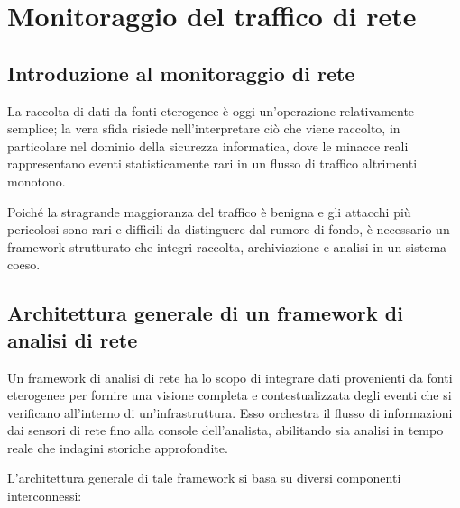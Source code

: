 \section{Monitoraggio del traffico di rete}

\subsection{Introduzione al monitoraggio di rete}

La raccolta di dati da fonti eterogenee è oggi un'operazione relativamente semplice;
la vera sfida risiede nell'interpretare ciò che viene raccolto, in particolare
nel dominio della sicurezza informatica, dove le minacce reali rappresentano
eventi statisticamente rari in un flusso di traffico altrimenti monotono.

Poiché la stragrande maggioranza del traffico è benigna e gli attacchi più pericolosi
sono rari e difficili da distinguere dal rumore di fondo, è necessario un framework
strutturato che integri raccolta, archiviazione e analisi in un sistema coeso.

\subsection{Architettura generale di un framework di analisi di rete}

Un framework di analisi di rete ha lo scopo di integrare dati provenienti da fonti eterogenee
per fornire una visione completa e contestualizzata degli eventi che si verificano
all'interno di un'infrastruttura.
Esso orchestra il flusso di informazioni dai sensori di rete fino alla console dell'analista,
abilitando sia analisi in tempo reale che indagini storiche approfondite.

L'architettura generale di tale framework si basa su diversi componenti interconnessi:

